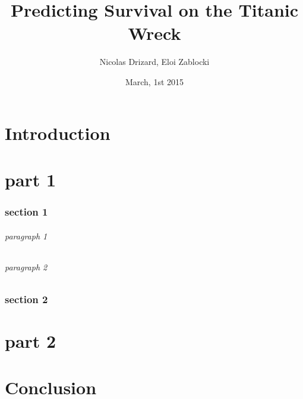 \documentclass[11pt,a4paper,portrait]{article}
\author{Nicolas Drizard, Eloi Zablocki}
\date{March, 1st 2015}
\title{Predicting Survival on the Titanic Wreck}
\begin{document}
\maketitle


\newpage
\part*{Introduction}


\part{part 1}
\setcounter{section}{0}


\section{section 1}


\paragraph{paragraph 1}

\paragraph{paragraph 2}



\section{section 2}


\part{part 2}
\setcounter{section}{0}


\part*{Conclusion}
\end{document}

